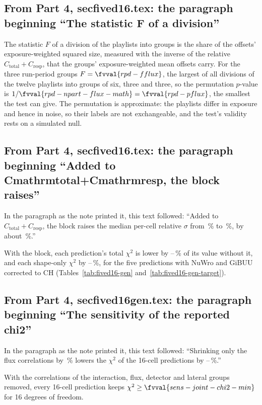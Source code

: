 \subsection{From Part 4, secfived16.tex: the paragraph beginning ``The statistic F of a division''}
The statistic $F$ of a division of the playlists into groups is the share of the offsets' exposure-weighted squared size, measured with the inverse of the relative $C_{\mathrm{total}}+C_{\mathrm{resp}}$, that the groups' exposure-weighted mean offsets carry. For the three run-period groups $F=\fvval{rpd-fflux}$, the largest of all  divisions of the twelve playlists into groups of six, three and three, so the permutation $p$-value is $1/\fvval{rpd-npart-flux-math}=\fvval{rpd-pflux}$, the smallest the test can give. The permutation is approximate: the playlists differ in exposure and hence in noise, so their labels are not exchangeable, and the test's validity rests on a simulated null.


\subsection{From Part 4, secfived16.tex: the paragraph beginning ``Added to Cmathrmtotal+Cmathrmresp, the block raises''}
In the paragraph as the note printed it, this text followed: ``Added to $C_{\mathrm{total}}+C_{\mathrm{resp}}$, the block raises the median per-cell relative $\sigma$ from \,\% to \,\%, by about \,\%.''\par
With the block, each prediction's total $\chi^2$ is lower by --\,\% of its value without it, and each shape-only $\chi^2$ by --\,\%, for the five predictions with NuWro and GiBUU corrected to CH (Tables~\ref{tab:fived16-gen} and~\ref{tab:fived16-gen-target}).

\subsection{From Part 4, secfived16gen.tex: the paragraph beginning ``The sensitivity of the reported chi2''}
In the paragraph as the note printed it, this text followed: ``Shrinking only the flux correlations by \,\% lowers the $\chi^2$ of the 16-cell predictions by --\,\%.''\par
With the correlations of the interaction, flux, detector and lateral groups removed, every 16-cell prediction keeps $\chi^2\geq\fvval{sens-joint-chi2-min}$ for 16 degrees of freedom.

